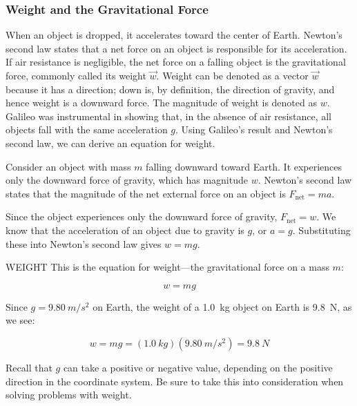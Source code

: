\documentclass[../../main-ap-physics.tex]{subfiles}
\begin{document}
\subsubsection*{Weight and the Gravitational Force}

When an object is dropped, it accelerates toward the center of Earth. Newton’s second law states that a net force on an object is responsible for its acceleration. If air resistance is negligible, the net force on a falling object is the gravitational force, commonly called its \gls{weight} $\vec{w}$. Weight can be denoted as a vector $\vec{w}$ because it has a direction; down is, by definition, the direction of gravity, and hence weight is a downward force. The magnitude of weight is denoted as $w$. Galileo was instrumental in showing that, in the absence of air resistance, all objects fall with the same acceleration $g$. Using Galileo’s result and Newton’s second law, we can derive an equation for weight.

\vspace{1em}

Consider an object with mass $m$ falling downward toward Earth. It experiences only the downward force of gravity, which has magnitude $w$. Newton’s second law states that the magnitude of the net external force on an object is $F_{\text{net}} = m a$.

\vspace{1em}

Since the object experiences only the downward force of gravity, $F_{\text{net}} = w$. We know that the acceleration of an object due to gravity is $g$, or $a = g$. Substituting these into Newton’s second law gives $w = mg$.

\begin{gradient}{WEIGHT}
    This is the equation for weight---the gravitational force on a mass $m$:

    \begin{equation}
        w = mg
    \end{equation}

    Since $g = \SI{9.80}{m/s^2}$ on Earth, the weight of a \SI{1.0}{kg} object on Earth is \SI{9.8}{N}, as we see:

    \begin{equation*}
        w = m g = \left(\SI{1.0}{kg}\right) \left(\SI{9.80}{m/s^2}\right) = \SI{9.8}{N}
    \end{equation*}

    Recall that $g$ can take a positive or negative value, depending on the positive direction in the coordinate system. Be sure to take this into consideration when solving problems with weight.
\end{gradient}
\end{document}
